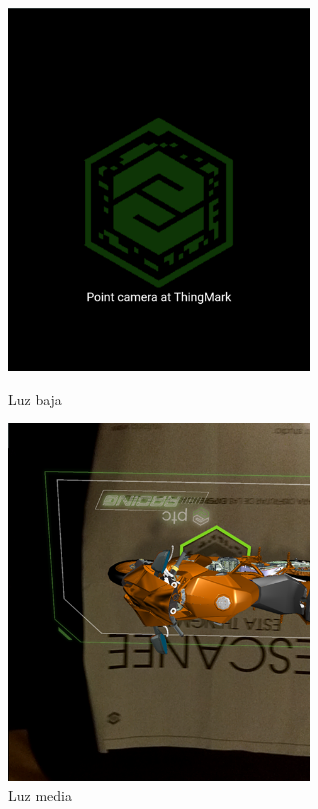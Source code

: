 \begin{figure}[H]
	\begin{minipage}{0.48\textwidth}
		\centering
		\includegraphics[width=8cm]{desarrollo/secciones/pruebas/Vuforia/img/3.png}
		\caption{Luz baja}
		\label{fig:vuforiaBaja}
	\end{minipage}\hfill
	\begin{minipage}{0.48\textwidth}
		\centering
		\includegraphics[width=8cm]{desarrollo/secciones/pruebas/Vuforia/img/9.png}
		\caption{Luz media}
		\label{fig:vuforiaLmedia}
	\end{minipage}\hfill
\end{figure}

